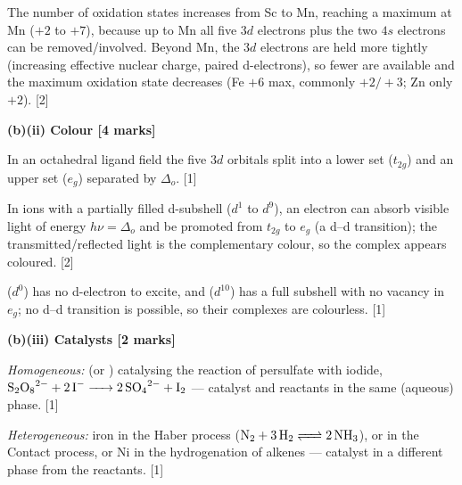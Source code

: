 \documentclass[11pt]{article}
\begin{document}
\begin{corrige}
The number of oxidation states increases from Sc to Mn, reaching a maximum at Mn ($+2$ to $+7$), because up to Mn all five $3d$ electrons plus the two $4s$ electrons can be removed/involved. Beyond Mn, the $3d$ electrons are held more tightly (increasing effective nuclear charge, paired d-electrons), so fewer are available and the maximum oxidation state decreases (Fe $+6$ max, commonly $+2/+3$; Zn only $+2$). \hfill [2]

\textbf{(b)(ii) Colour [4 marks]}

In an octahedral ligand field the five $3d$ orbitals split into a lower set ($t_{2g}$) and an upper set ($e_g$) separated by $\Delta_o$. \hfill [1]

In ions with a partially filled d-subshell ($d^1$ to $d^9$), an electron can absorb visible light of energy $h\nu = \Delta_o$ and be promoted from $t_{2g}$ to $e_g$ (a d--d transition); the transmitted/reflected light is the complementary colour, so the complex appears coloured. \hfill [2]

 ($d^0$) has no d-electron to excite, and  ($d^{10}$) has a full subshell with no vacancy in $e_g$; no d--d transition is possible, so their complexes are colourless. \hfill [1]

\textbf{(b)(iii) Catalysts [2 marks]}

\emph{Homogeneous:}  (or ) catalysing the reaction of persulfate with iodide, $\ce{S2O8^{2-} + 2I^- -> 2SO4^{2-} + I2}$ — catalyst and reactants in the same (aqueous) phase. \hfill [1]

\emph{Heterogeneous:} iron in the Haber process ($\ce{N2 + 3H2 <=> 2NH3}$), or  in the Contact process, or Ni in the hydrogenation of alkenes — catalyst in a different phase from the reactants. \hfill [1]
\end{corrige}
\end{document}
